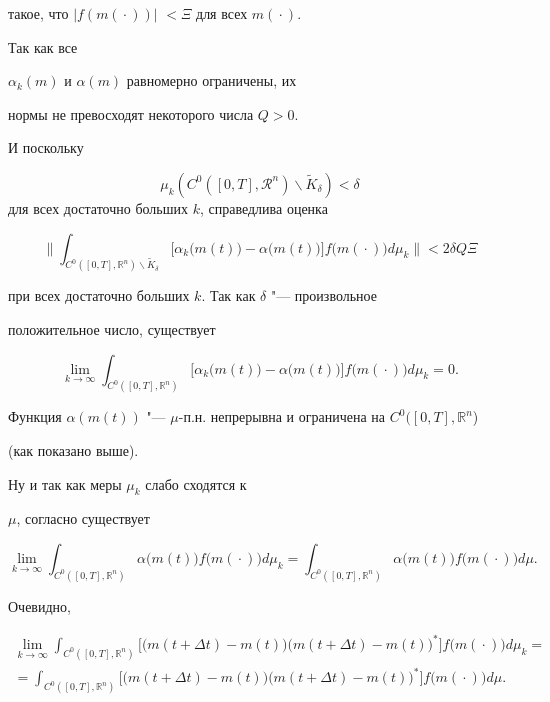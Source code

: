 такое, что $|f(m({}\cdot{}))|$ $<\Xi$ для всех $m({}\cdot{})$. 

Так как  все

$\alpha_k(m)$ и $\alpha(m)$ равномерно ограничены, их

нормы не превосходят некоторого числа $Q>0$. 

И поскольку

$$\mu_k(C^0([0,T],\mathcal{R}^n)\backslash {\tilde

K}_\delta)<\delta$$ для всех достаточно больших $k$, справедлива оценка

$$

\biggl

\|

\int_{C^0([0,T],\mathbb{R}^n)\backslash \tilde K_\delta}

\bigl

[\alpha_k \bigl(m(t))-\alpha(m(t) \bigr)\bigr]f\bigl(m({}\cdot{})\bigr)d\mu_k

\biggr

\|<2\delta Q\Xi

$$

при всех достаточно больших $k$. Так как $\delta$ "--- произвольное

положительное число, существует

$$

\lim\limits_{k\to\infty}\int_{C^0([0,T],\mathbb{R}^n)}

\bigl [\alpha_k \bigl(m(t))- \alpha(m(t)\bigr)\bigr]f\bigl(m({}\cdot{})\bigr)d\mu_k=0.

$$

Функция  $\alpha(m(t))$ "--- $\mu$-п.н.  непрерывна  и ограничена  на  $C^0  ([0,T],\mathbb{R}^n$)  

(как  показано выше). 

Ну  и  так  как  меры  $\mu_k$  слабо  сходятся  к 

$\mu$,  согласно \cite[теорема~2, \S~1, гл.~VI]{popovkoval:bib:GS} существует

$$

\lim\limits_{k\to\infty}\int_{C^0([0,T],\mathbb{R}^n)} 

\alpha\bigl(m(t) \bigr) f\bigl(m({}\cdot{})\bigr)d\mu_k=\int_{C^0([0,T],\mathbb{R}^n)}

\alpha\bigl(m(t)\bigr) f\bigl(m({}\cdot{})\bigr)d\mu.

$$

Очевидно,

\begin{multline}

\lim\limits_{k\to\infty}\int_{C^0([0,T],\mathbb{R}^n)} 

\bigl [ \bigl(m(t+\Delta t)-m(t)\bigr)\bigl(m(t+\Delta t)-m(t)\bigr)^* \bigr]f\bigl(m({}\cdot{})\bigr) d\mu_k

=\\

=\int_{C^0([0,T],\mathbb{R}^n)}

\bigl[ \bigl(m(t+\Delta t)-m(t)\bigr) \bigl(m(t+\Delta t)-m(t)\bigr)^*\bigr]f\bigl(m({}\cdot{})\bigr)d\mu.

\end{multline}


